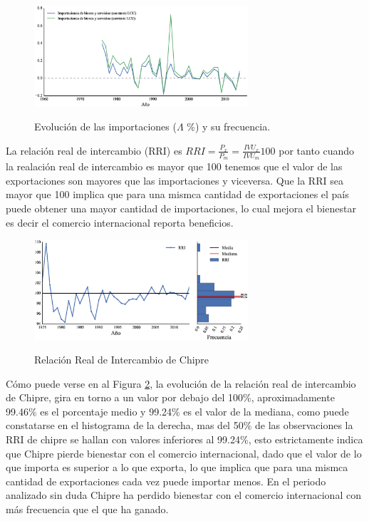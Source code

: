 \documentclass[a4paper,openright,12pt]{book}
\begin{document}
\begin{figure}[htb]
    \caption{Evolución de las importaciones ($\Lambda$ \%) y su frecuencia.}
    \centering
    \includegraphics[width=300px]{imgs/ev_m.eps}
    \label{ev_m}
\end{figure}

La relación real de intercambio (RRI) es $RRI = \frac{P_x}{P_m} = \frac{IVU_x}{IVU_m} 100$ por tanto cuando la realación real de intercambio es mayor que 100 tenemos que el valor de las exportaciones son mayores que las importaciones y viceversa. Que la RRI sea mayor que 100 implica que para una mismca cantidad de exportaciones el país puede obtener una mayor cantidad de importaciones, lo cual mejora el bienestar es decir el comercio internacional reporta beneficios.

\begin{figure}[htb]
    \centering
    \caption{Relación Real de Intercambio de Chipre}
    \includegraphics[width=300px]{imgs/rri_0.eps}
    \label{rri}
\end{figure}

Cómo puede verse en al Figura \ref{rri}, la evolución de la relación real de intercambio de Chipre, gira en torno a un valor por debajo del 100\%, aproximadamente 99.46\% es el porcentaje medio y 99.24\% es el valor de la mediana, como puede constatarse en el histograma de la derecha, mas del 50\% de las observaciones la RRI de chipre se hallan con valores inferiores al 99.24\%, esto estrictamente indica que Chipre pierde bienestar con el comercio internacional, dado que el valor de lo que importa es superior a lo que exporta, lo que implica que para una mismca cantidad de exportaciones cada vez puede importar menos. En el periodo analizado sin duda Chipre ha perdido bienestar con el comercio internacional con más frecuencia que el que ha ganado.
\end{document}
